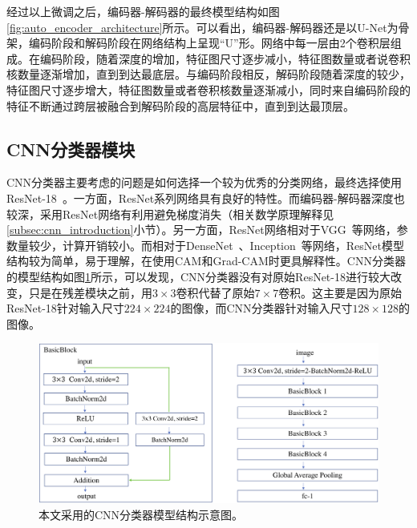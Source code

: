 经过以上微调之后，编码器-解码器的最终模型结构如图\ref{fig:auto_encoder_architecture}所示。可以看出，编码器-解码器还是以U-Net为骨架，编码阶段和解码阶段在网络结构上呈现“U”形。网络中每一层由2个卷积层组成。在编码阶段，随着深度的增加，特征图尺寸逐步减小，特征图数量或者说卷积核数量逐渐增加，直到到达最底层。与编码阶段相反，解码阶段随着深度的较少，特征图尺寸逐步增大，特征图数量或者卷积核数量逐渐减小，同时来自编码阶段的特征不断通过跨层被融合到解码阶段的高层特征中，直到到达最顶层。
\subsection{CNN分类器模块}\label{subsec:cnn_classifier_model}
CNN分类器主要考虑的问题是如何选择一个较为优秀的分类网络，最终选择使用ResNet-18~\cite{he2016deep}。一方面，ResNet系列网络具有良好的特性。而编码器-解码器深度也较深，采用ResNet网络有利用避免梯度消失（相关数学原理解释见\ref{subsec:cnn_introduction}小节）。另一方面，ResNet网络相对于VGG~\cite{simonyan2014very}等网络，参数量较少，计算开销较小。而相对于DenseNet~\cite{huang2017densely}、Inception~\cite{szegedy2016rethinking, szegedy2017inception}等网络，ResNet模型结构较为简单，易于理解，在使用CAM和Grad-CAM时更具解释性。CNN分类器的模型结构如图\ref{fig:classifier_architecture}所示，可以发现，CNN分类器没有对原始ResNet-18进行较大改变，只是在残差模块之前，用$3\times 3$卷积代替了原始$7\times 7$卷积。这主要是因为原始ResNet-18针对输入尺寸$224\times 224$的图像，而CNN分类器针对输入尺寸$128\times 128$的图像。
\begin{figure}[h]
	\centering
	\includegraphics[width=1.0\textwidth]{figure/classifier_architecture.png}
	\caption{本文采用的CNN分类器模型结构示意图。}
	\label{fig:classifier_architecture}
\end{figure}
